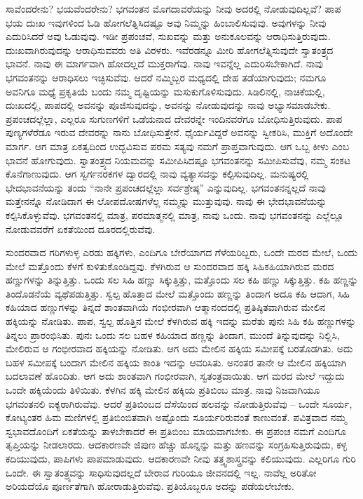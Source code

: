 ಸಾವೆಂದರೇನು? ಭಯವೆಂದರೇನು? ಭಗವಂತನ ಮೊಗದಾವರೆಯನ್ನು ನೀವು ಅದರಲ್ಲಿ ನೋಡುವುದಿಲ್ಲವೆ? ಪಾಪ ಭಯ ದುಃಖ ಇವುಗಳಿಂದ ಓಡಿ ಹೋಗಲೆತ್ನಿಸಿದಷ್ಟೂ ಅವು ನಿಮ್ಮನ್ನು ಹಿಂಬಾಲಿಸುವುವು. ಅವುಗಳನ್ನು ನೀವು ಎದುರಿಸಿದರೆ ಅವು ಓಡುವುವು. ಇಡೀ ಪ್ರಪಂಚವೆ, ಸುಖವನ್ನು ಮತ್ತು ಅನುಕೂಲವನ್ನು ಆರಾಧಿಸುತ್ತಿರುವುದು. ದುಃಖವಾಗಿರುವುದನ್ನು ಆರಾಧಿಸುವವರು ಅತಿ ವಿರಳರು. ಇವೆರಡನ್ನೂ ಮೀರಿ ಹೋಗಲೆತ್ನಿಸುವುದೇ ಸ್ವಾತಂತ್ರ್ಯದ ಭಾವನೆ. ನಾವು ಈ ಮಾರ್ಗವಾಗಿ ಹೋದಲ್ಲದೆ ಮುಕ್ತರಾಗೆವು. ನಾವು ಇವನ್ನೆಲ್ಲ ಎದುರಿಸಬೇಕಾಗಿದೆ. ನಾವು ಭಗವಂತನನ್ನು ಆರಾಧಿಸಲು ಇಚ್ಛಿಸುವೆವು. ಆದರೆ ನಮ್ಮಿಬ್ಬರ ಮಧ್ಯದಲ್ಲಿ ದೇಹ ತಡೆಯಾಗುವುದು; ನಮಗೂ ಅವನಿಗೂ ಮಧ್ಯೆ ಪ್ರಕೃತಿಯೆ ಬಂದು ನಮ್ಮ ದೃಷ್ಟಿಯನ್ನು ಮಸುಕುಗೊಳಿಸುವುದು. ಸಿಡಿಲಿನಲ್ಲಿ, ನಾಚಿಕೆಯಲ್ಲಿ, ದುಃಖದಲ್ಲಿ, ಪಾಪದಲ್ಲಿ ಅವನನ್ನು ಪೂಜಿಸುವುದನ್ನು, ಅವನನ್ನು ನೋಡುವುದನ್ನು ನಾವು ಅಭ್ಯಾಸಮಾಡಬೇಕು. ಪ್ರಪಂಚದಲ್ಲೆಲ್ಲಾ, ಎಲ್ಲರೂ ಸುಗುಣಗಳಿಗೆ ಒಡೆಯನಾದ ದೇವರನ್ನೇ ಇಂದಿನವರೆಗೂ ಬೋಧಿಸುತ್ತಿರುವುದು. ಪಾಪ ಪುಣ್ಯಗಳೆರೆಡೂ ಇರುವ ದೇವರನ್ನು ನಾನು ಬೋಧಿಸುತ್ತೇನೆ. ಧೈರ್ಯವಿದ್ದರೆ ಅವನನ್ನು ಸ್ವೀಕರಿಸಿ, ಮುಕ್ತಿಗೆ ಅದೊಂದೇ ಮಾರ್ಗ. ಆಗ ಮಾತ್ರ ಏಕತ್ವದಿಂದ ಉದ್ಭವಿಸುವ ಪರಮ ಸತ್ಯವು ನಮಗೆ ಪ್ರಾಪ್ತವಾಗುವುದು. ಆಗ ಒಬ್ಬ ಕೀಳು ಎಂಬ ಭಾವನೆ ಹೋಗುವುದು. ಸ್ವಾತಂತ್ರ್ಯದ ನಿಯಮವನ್ನು ಸಮೀಪಿಸಿದಷ್ಟೂ ಭಗವಂತನನ್ನು ಸಮೀಪಿಸುವೆವು, ನಮ್ಮ ಸಂಕಟ ಕೊನೆಗಾಣುವುದು. ಆಗ ಸ್ವರ್ಗನರಕಗಳ ದ್ವಾರದಲ್ಲಿ ನಾವು ವ್ಯತ್ಯಾಸವನ್ನು ಕಲ್ಪಿಸುವುದಿಲ್ಲ. ಮನುಷ್ಯರಲ್ಲಿ ಭೇದಭಾವನೆಯನ್ನು ತಂದು “ನಾನೇ ಪ್ರಪಂಚದಲ್ಲೆಲ್ಲಾ ಸರ್ವಶ್ರೇಷ್ಠ” ಎನ್ನುವುದಿಲ್ಲ. ಭಗವಂತನನ್ನಲ್ಲದೆ ನಾವು ಮತ್ತೇನನ್ನೊ ನೋಡಿದಾಗ ಈ ಲೋಪದೋಷಗಳೆಲ್ಲ ನಮ್ಮನ್ನು ಮುತ್ತುವುವು. ನಾವು ಈ ಭೇದಭಾವನೆಯನ್ನು ಕಲ್ಪಿಸಿಕೊಳ್ಳುವೆವು. ಭಗವಂತನಲ್ಲಿ ಮಾತ್ರ, ಪರಮಾತ್ಮನಲ್ಲಿ ಮಾತ್ರ, ನಾವು ಒಂದು. ನಾವು ಭಗವಂತನನ್ನು ಎಲ್ಲೆಲ್ಲೂ ನೋಡುವವರೆಗೆ ಏಕತೆಯಿಂದ ದೂರದಲ್ಲಿರುವೆವು.

ಸುಂದರವಾದ ಗರಿಗಳುಳ್ಳ ಎರಡು ಹಕ್ಕಿಗಳು, ಎಂದಿಗೂ ಬೇರೆಯಾಗದ ಗೆಳೆಯರಿಬ್ಬರು, ಒಂದೇ ಮರದ ಮೇಲೆ, ಒಂದು ಮೇಲೆ ಮತ್ತೊಂದು ಕೆಳಗೆ ಕುಳಿತುಕೊಂಡಿದ್ದವು. ಕೆಳಗಿರುವ ಆ ಸುಂದರವಾದ ಹಕ್ಕಿ ಸಿಹಿಕಹಿಯಾಗಿರುವ ಮರದ ಹಣ್ಣುಗಳನ್ನು ತಿನ್ನುತ್ತಿತ್ತು. ಒಂದು ಸಲ ಸಿಹಿ ಹಣ್ಣು ಸಿಕ್ಕುತ್ತಿತ್ತು, ಮತ್ತೊಂದು ಸಲ ಕಹಿ ಹಣ್ಣು ಸಿಕ್ಕುತ್ತಿತ್ತು. ಕಹಿ ಹಣ್ಣನ್ನು ತಿಂದೊಡನೆಯೆ ವ್ಯಥೆಪಡುತ್ತಿತ್ತು. ಸ್ವಲ್ಪ ಹೊತ್ತಾದ ಮೇಲೆ ಮತ್ತೊಂದು ಹಣ್ಣನ್ನು ತಿಂದಾಗ ಅದೂ ಕಹಿ ಆದಾಗ, ಸಿಹಿ ಕಹಿಯಾದ ಹಣ್ಣುಗಳನ್ನು ತಿನ್ನದೆ ಶಾಂತವಾಗಿಯೆ ಗಂಭೀರವಾಗಿ ಆತ್ಮಾನಂದದಲ್ಲಿ ಪ್ರತಿಷ್ಠಿತವಾಗಿರುವ ಮೇಲಿನ ಹಕ್ಕಿಯನ್ನು ನೋಡಿತು. ಪಾಪ, ಸ್ವಲ್ಪ ಹೊತ್ತಿನ ಮೇಲೆ ಕೆಳಗಿರುವ ಹಕ್ಕಿ ಇದನ್ನು ಮರೆತು ಪುನಃ ಸಿಹಿ ಕಹಿ ಹಣ್ಣುಗಳನ್ನು ತಿನ್ನಲು ಪ್ರಾರಂಭಿಸಿತು. ಪುನಃ ಒಂದು ಸಲ ಬಹಳ ಕಹಿಯಾದ ಹಣ್ಣನ್ನು ತಿಂದಾಗ, ಮುಂದೆ ತಿನ್ನುವುದನ್ನು ನಿಲ್ಲಿಸಿ, ಮೇಲಿರುವ ಆ ಗಂಭೀರವಾದ ಹಕ್ಕಿಯನ್ನು ನೋಡಿತು. ಆಗ ಅದು ಮೇಲಿನ ಹಕ್ಕಿಯ ಸಮೀಪಕ್ಕೆ ಬರತೊಡಗಿತು. ಅದು ಬಹಳ ಸಮೀಪಕ್ಕೆ ಬಂದಾಗ ಮೇಲಿನ ಹಕ್ಕಿಯ ಕಾಂತಿ ಇದನ್ನು ಆವರಿಸಿತು. ಅನಂತರ ತಾನೇ ಆ ಮೇಲಿನ ಹಕ್ಕಿಯಾಗಿ ಬದಲಾವಣೆ ಹೊಂದಿತು. ಆಗ ಅದು ಶಾಂತವಾಗಿ ಗಂಭೀರವಾಗಿ, ಸ್ವತಂತ್ರವಾಯಿತು. ಆಗ ಮರದ ಮೇಲೆ ಇದ್ದುದು ಒಂದೇ ಹಕ್ಕಿಯೆಂದು ತಿಳಿಯಿತು. ಕೆಳಗಿನ ಹಕ್ಕಿ ಮೇಲಿನ ಹಕ್ಕಿಯ ಪ್ರತಿಬಿಂಬ ಮಾತ್ರ. ನಾವು ನಿಜವಾಗಿಯೂ ಭಗವಂತನಲಿ ಐಕ್ಯರಾಗಿರುವೆವು. ಆದರೆ ಪ್ರತಿಬಿಂಬದ ದೆಸೆಯಿಂದ ಹಲವನ್ನು ನೋಡುತ್ತಿರುವೆವು – ಒಂದೇ ಸೂರ್ಯ, ಕೋಟ್ಯಂತರ ಹಿಮ ಮಣಿಗಳಲ್ಲಿ ಪ್ರತಿಬಿಂಬಿತವಾಗಿ ಅಷ್ಟೊಂದು ಸೂರ್ಯರಿರುವಂತೆ ಕಾಣುವಂತೆ. ಪವಿತ್ರವಾದ ನಮ್ಮ ಸ್ವಭಾವದೊಂದಿಗೆ ಏಕತೆಯನ್ನು ತಾಳಬೇಕಾದರೆ ಈ ಪ್ರತಿಬಿಂಬ ಮಾಯವಾಗಬೇಕು. ಈ ಪ್ರಪಂಚ ನಮಗೆ ಎಂದಿಗೂ ತೃಪ್ತಿಯನ್ನು ನೀಡಲಾರದು. ಆದಕಾರಣವೇ ಜಿಪುಣ ಹೆಚ್ಚು ಹೊನ್ನನ್ನು ಮತ್ತು ಹಣವನ್ನು ಸಂಗ್ರಹಿಸುತ್ತಿರುವುದು, ಕಳ್ಳ ಕದಿಯುವುದು, ಪಾಪಿಗಳು ಪಾಪಮಾಡುವುದು. ಆದಕಾರಣವೇ ನೀವು ತತ್ತ್ವಶಾಸ್ತ್ರವನ್ನು ಕಲಿಯುವುದು. ಎಲ್ಲರಿಗೂ ಗುರಿ ಒಂದೇ. ಈ ಸ್ವಾತಂತ್ರ್ಯವನ್ನು ಸಾಧಿಸುವುದಲ್ಲದೆ ಬೇರಾವ ಗುರಿಯೂ ಜೀವನದಲ್ಲಿ ಇಲ್ಲ. ನಾವೆಲ್ಲ ಅರಿತೋ ಅರಿಯದೆಯೊ ಪೂರ್ಣತೆಗಾಗಿ ಹೋರಾಡುತ್ತಿರುವೆವು. ಪ್ರತಿಯೊಬ್ಬರೂ ಅದನ್ನು ಪಡೆಯಲೇಬೇಕು.

